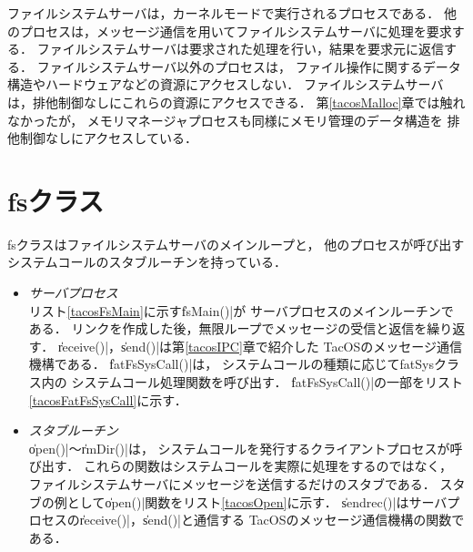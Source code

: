 ファイルシステムサーバは，カーネルモードで実行されるプロセスである．
他のプロセスは，メッセージ通信を用いてファイルシステムサーバに処理を要求する．
ファイルシステムサーバは要求された処理を行い，結果を要求元に返信する．
ファイルシステムサーバ以外のプロセスは，
ファイル操作に関するデータ構造やハードウェアなどの資源にアクセスしない．
ファイルシステムサーバは，排他制御なしにこれらの資源にアクセスできる．
第\ref{tacosMalloc}章では触れなかったが，
メモリマネージャプロセスも同様にメモリ管理のデータ構造を
排他制御なしにアクセスしている．

\section{fsクラス}
fsクラスはファイルシステムサーバのメインループと，
他のプロセスが呼び出すシステムコールのスタブルーチンを持っている．

\begin{itemize}
\item \emph{サーバプロセス}\\
  リスト\ref{tacosFsMain}に示す\|fsMain()|が
  サーバプロセスのメインルーチンである．
  リンクを作成した後，無限ループでメッセージの受信と返信を繰り返す．
  \|receive()|，\|send()|は第\ref{tacosIPC}章で紹介した
  TacOSのメッセージ通信機構である．
  \|fatFsSysCall()|は，
  システムコールの種類に応じてfatSysクラス内の
  システムコール処理関数を呼び出す．
  \|fatFsSysCall()|の一部をリスト\ref{tacosFatFsSysCall}に示す．
  
  
\item \emph{スタブルーチン}\\
  \|open()|〜\|rmDir()|は，
  システムコールを発行するクライアントプロセスが呼び出す．
  これらの関数はシステムコールを実際に処理をするのではなく，
  ファイルシステムサーバにメッセージを送信するだけのスタブである．
  スタブの例として\|open()|関数をリスト\ref{tacosOpen}に示す．
  \|sendrec()|はサーバプロセスの\|receive()|，\|send()|と通信する
  TacOSのメッセージ通信機構の関数である．
  
\end{itemize}

